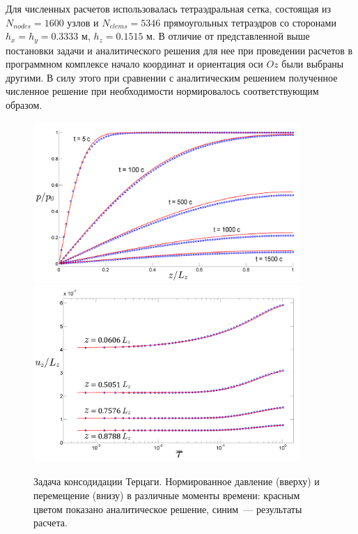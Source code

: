 Для численных расчетов использовалась тетраэдральная сетка, состоящая из 
$N_{nodes} = 1600$ узлов и $N_{elems} = 5346$ прямоугольных тетраэдров со сторонами
$h_x = h_y = 0.3333$ м, $h_z = 0.1515$ м. В отличие от представленной выше постановки задачи и аналитического решения
для нее при проведении расчетов в программном комплексе начало координат и ориентация оси $Oz$ были выбраны другими.
В силу этого при сравнении с аналитическим решением полученное численное решение при необходимости нормировалось соответствующим образом.

%
\begin{figure}[t!]
\centering
\includegraphics[width=0.9\textwidth]{./figs/pp0Ter.png}\\
\includegraphics[width=0.9\textwidth]{./figs/uu0Ter.png}
\caption{ Задача консодидации Терцаги. Нормированное давление (вверху) и перемещение (внизу) в
  различные моменты времени: красным цветом показано
аналитическое решение, синим~--- результаты расчета.}\label{fig:terp}
\end{figure}
% 
% 
 

